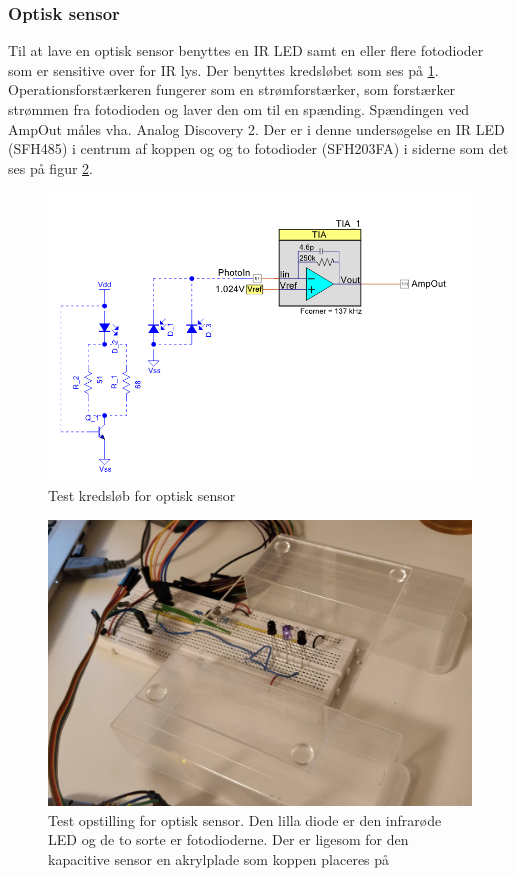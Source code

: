 \documentclass[HardwareDesign/HardwareDesign_main.tex]{subfiles}
\begin{document}
\subsubsection{Optisk sensor}
Til at lave en optisk sensor benyttes en IR LED samt en eller flere fotodioder som er sensitive over for IR lys. Der benyttes kredsløbet som ses på \ref{fig:optic_test_diagram}. Operationsforstærkeren fungerer som en strømforstærker, som forstærker strømmen fra fotodioden og laver den om til en spænding. Spændingen ved AmpOut måles vha. Analog Discovery 2. Der er i denne undersøgelse en IR LED (SFH485\autocite{SFH485}) i centrum af koppen og og to fotodioder (SFH203FA\autocite{SFH203FA}) i siderne som det ses på figur \ref{fig:optic_opstilling}. 
\begin{figure}[H]
    \centering
    \includegraphics[width=\textwidth]{HardwareDesign/CupSensor/graphics/OpticTest/diagram.PNG}
    \caption{Test kredsløb for optisk sensor}
    \label{fig:optic_test_diagram}
\end{figure}

\begin{figure}[H]
    \centering
    \includegraphics[width=\textwidth]{HardwareDesign/CupSensor/graphics/OpticTest/Optic_testopstillign.jpg}
    \caption{Test opstilling for optisk sensor. Den lilla diode er den infrarøde LED og de to sorte er fotodioderne. Der er ligesom for den kapacitive sensor en akrylplade som koppen placeres på}
    \label{fig:optic_opstilling}
\end{figure}
\end{document}
